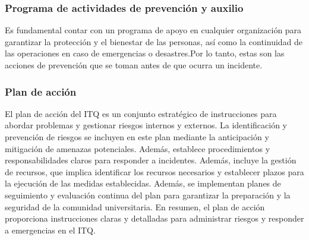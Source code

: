 \subsubsection{Programa de actividades de prevención y auxilio}

Es fundamental contar con un programa de apoyo en cualquier organización para garantizar la protección y el bienestar de las personas, así como la continuidad de las operaciones en caso de emergencias o desastres.Por lo tanto, estas son las acciones de prevención que se toman antes de que ocurra un incidente.

% 
% 
\subsubsection{Plan de acción}

El plan de acción del ITQ es un conjunto estratégico de instrucciones para abordar problemas y gestionar riesgos internos y externos. La identificación y prevención de riesgos se incluyen en este plan mediante la anticipación y mitigación de amenazas potenciales. Además, establece procedimientos y responsabilidades claros para responder a incidentes. Además, incluye la gestión de recursos, que implica identificar los recursos necesarios y establecer plazos para la ejecución de las medidas establecidas. Además, se implementan planes de seguimiento y evaluación continua del plan para garantizar la preparación y la seguridad de la comunidad universitaria. En resumen, el plan de acción proporciona instrucciones claras y detalladas para administrar riesgos y responder a emergencias en el ITQ. 

